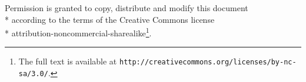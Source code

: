 \begin{titlepage}
	\centering\vspace*{\fill}
	\noindent
	Permission is granted to copy, distribute and modify this document\\*
	according to the terms of the Creative Commons license\\*
	attribution-noncommercial-sharealike\footnote{The full text is available at {\tt http://creativecommons.org/licenses/by-nc-sa/3.0/}.}.
\end{titlepage}
